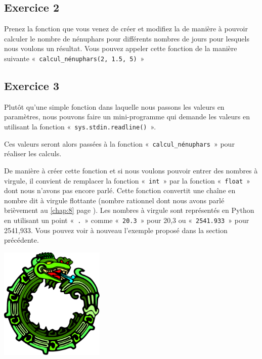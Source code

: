 \subsection{Exercice 2}
Prenez la fonction que vous venez de créer et modifiez la de manière à pouvoir calculer le nombre de nénuphars pour différents nombres de jours pour lesquels nous voulons un résultat.
Vous pouvez appeler cette fonction de la manière suivante « \texttt{calcul\_nénuphars(2, 1.5, 5)} » 

\subsection{Exercice 3}
Plutôt qu'une simple fonction dans laquelle nous passons les valeurs en paramètres, nous pouvons faire un mini-programme qui demande les valeurs en utilisant la fonction « \texttt{sys.stdin.readline()} ».

Ces valeurs seront alors passées à la fonction « \texttt{calcul\_nénuphars} » pour réaliser les calculs.

De manière à créer cette fonction et si nous voulons pouvoir entrer des nombres à virgule, il convient de remplacer la fonction « \texttt{int} » par la fonction « \texttt{float} » dont nous n'avons pas encore parlé.
Cette fonction convertit une chaîne en nombre dit à virgule flottante (nombre rationnel dont nous avons parlé brièvement au \autoref{chap:8} page \pageref{chap:8}). Les nombres à virgule sont représentés en Python en utilisant un point « \texttt{.} » comme « \texttt{20.3} » pour 20,3 ou « \texttt{2541.933} »  pour 2541,933. Vous pouvez voir à nouveau l'exemple  proposé dans la section précédente.

 \vfill
\begin{center}
 \includegraphics[width=5cm]{images/ourochin.pdf}
\end{center}
 \vfill
 
